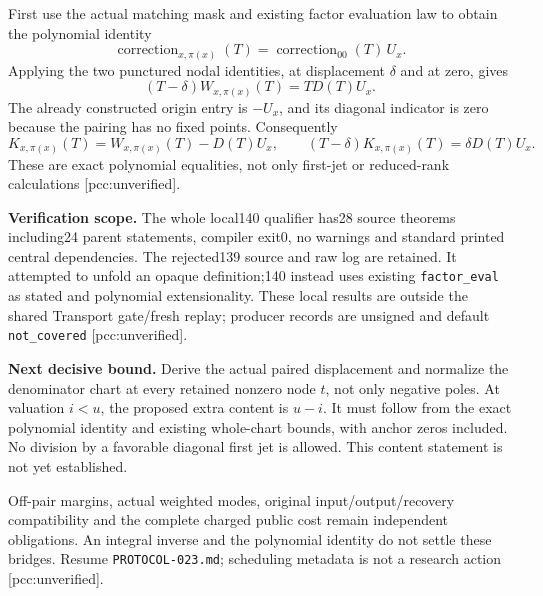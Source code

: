 \documentclass[10pt]{article}
\begin{document}
First use the actual matching mask and existing factor evaluation law to
obtain the polynomial identity
\[
 \operatorname{correction}_{x,\pi(x)}(T)
 =\operatorname{correction}_{00}(T)\,U_x.
\]
Applying the two punctured nodal identities, at displacement $\delta$ and
at zero, gives
\[
 (T-\delta)W_{x,\pi(x)}(T)=T D(T)U_x.
\]
The already constructed origin entry is $-U_x$, and its diagonal indicator
is zero because the pairing has no fixed points. Consequently
\[
 K_{x,\pi(x)}(T)=W_{x,\pi(x)}(T)-D(T)U_x,
 \qquad
 \boxed{(T-\delta)K_{x,\pi(x)}(T)=\delta D(T)U_x.}
\]
These are exact polynomial equalities, not only first-jet or reduced-rank
calculations [pcc:unverified].

\textbf{Verification scope.} The whole local140 qualifier has28 source
theorems including24 parent statements, compiler exit0, no warnings and
standard printed central dependencies. The rejected139 source and raw log
are retained. It attempted to unfold an opaque definition;140 instead uses
existing \texttt{factor\_eval} as stated and polynomial extensionality.
These local results are outside the shared Transport gate/fresh replay;
producer records are unsigned and default \texttt{not\_covered}
[pcc:unverified].

\textbf{Next decisive bound.} Derive the actual paired displacement and
normalize the denominator chart at every retained nonzero node $t$, not only
negative poles. At valuation $i<u$, the proposed extra content is $u-i$.
It must follow from the exact polynomial identity and existing whole-chart
bounds, with anchor zeros included. No division by a favorable diagonal
first jet is allowed. This content statement is not yet established.

Off-pair margins, actual weighted modes, original input/output/recovery
compatibility and the complete charged public cost remain independent
obligations. An integral inverse and the polynomial identity do not settle
these bridges. Resume \texttt{PROTOCOL-023.md}; scheduling metadata is not a
research action [pcc:unverified].
\end{document}
